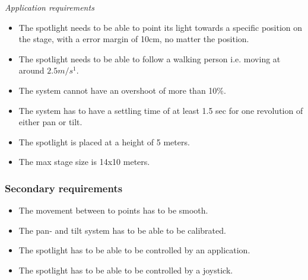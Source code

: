 \textit{Application requirements}

\begin{itemize}
\item The spotlight needs to be able to point its light towards a specific position on the stage, with a error margin of 10cm, no matter the position.

\item The spotlight needs to be able to follow a walking person i.e. moving at around $2.5 m/s^{1}$.

\item The system cannot have an overshoot of more than 10\%.

\item The system has to have a settling time of at least 1.5 sec for one revolution of either pan or tilt.

\item The spotlight is placed at a height of 5 meters.

\item The max stage size is 14x10 meters.
\end{itemize}


\subsubsection{Secondary requirements}

\begin{itemize}
\item The movement between to points has to be smooth.

\item The pan- and tilt system has to be able to be calibrated.

\item The spotlight has to be able to be controlled by an application.

\item The spotlight has to be able to be controlled by a joystick.
\end{itemize}